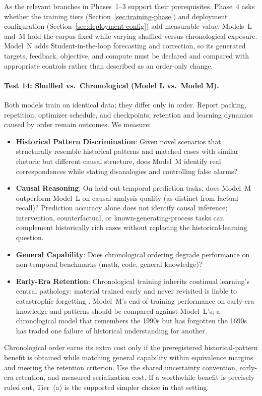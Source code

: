 As the relevant branches in Phases~1--3 support their prerequisites, Phase~4
asks whether the training tiers (Section~\ref{sec:training-phase}) and
deployment configuration (Section~\ref{sec:deployment-config}) add measurable
value. Models~L and~M hold the corpus fixed while varying shuffled
versus chronological exposure. Model~N adds Student-in-the-loop forecasting
and correction, so its generated targets, feedback, objective, and compute must
be declared and compared with appropriate controls rather than described as an
order-only change.

\paragraph{Test 14: Shuffled vs.\ Chronological (Model L vs.\ Model M).}
Both models train on identical data; they differ only in order. Report packing, repetition, optimizer schedule, and checkpoints; retention
and learning dynamics caused by order remain outcomes. We measure:
\begin{itemize}
    \item \textbf{Historical Pattern Discrimination}: Given novel scenarios
    that structurally resemble historical patterns and matched cases with
    similar rhetoric but different causal structure, does Model~M identify real
    correspondences while stating disanalogies and controlling false alarms?
    \item \textbf{Causal Reasoning}: On held-out temporal prediction tasks, does Model~M outperform Model~L on causal analysis quality (as distinct from factual recall)? Prediction accuracy alone does not identify causal inference; intervention, counterfactual, or known-generating-process tasks can complement historically rich cases without replacing the historical-learning question.
    \item \textbf{General Capability}: Does chronological ordering degrade performance on non-temporal benchmarks (math, code, general knowledge)?
    \item \textbf{Early-Era Retention}: Chronological training inherits continual learning's central pathology: material trained early and never revisited is liable to catastrophic forgetting \cite{vandeven2024continuallearningcatastrophicforgetting}. Model~M's end-of-training performance on early-era knowledge and patterns should be compared against Model~L's; a chronological model that remembers the 1990s but has forgotten the 1690s has traded one failure of historical understanding for another.
\end{itemize}
Chronological order earns its extra cost only if the preregistered historical-pattern benefit is obtained while matching general capability within equivalence margins and meeting the retention criterion. Use the shared uncertainty convention, early-era retention, and measured serialization cost. If a worthwhile benefit is precisely ruled out, Tier~(a) is the supported simpler choice in that setting.

